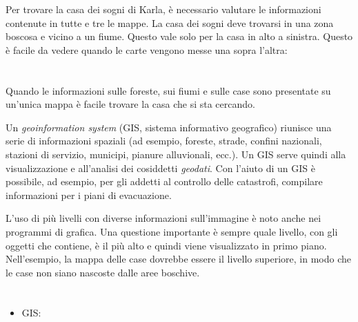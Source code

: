 {{{\centering%
\par}

Per trovare la casa dei sogni di Karla, è necessario valutare le informazioni contenute in tutte e tre le mappe. La casa dei sogni deve trovarsi in una zona boscosa e vicino a un fiume. Questo vale solo per la casa in alto a sinistra. Questo è facile da vedere quando le carte vengono messe una sopra l’altra:

{\centering%
\par}



\section*{\BrochureItsInformatics}
Quando le informazioni sulle foreste, sui fiumi e sulle case sono presentate su un’unica mappa è facile trovare la casa che si sta cercando.

Un \emph{geoinformation system} (GIS, sistema informativo geografico) riunisce una serie di informazioni spaziali (ad esempio, foreste, strade, confini nazionali, stazioni di servizio, municipi, pianure alluvionali, ecc.). Un GIS serve quindi alla visualizzazione e all’analisi dei cosiddetti \emph{geodati}. Con l’aiuto di un GIS è possibile, ad esempio, per gli addetti al controllo delle catastrofi, compilare informazioni per i piani di evacuazione.

L’uso di più livelli con diverse informazioni sull’immagine è noto anche nei programmi di grafica. Una questione importante è sempre quale livello, con gli oggetti che contiene, è il più alto e quindi viene visualizzato in primo piano. Nell’esempio, la mappa delle case dovrebbe essere il livello superiore, in modo che le case non siano nascoste dalle aree boschive.



\section*{\BrochureWebsitesAndKeywords}
{\raggedright
\begin{itemize}
  \item GIS: \href{https://it.wikipedia.org/wiki/Geographic_information_system}{}
\end{itemize}


}}}
